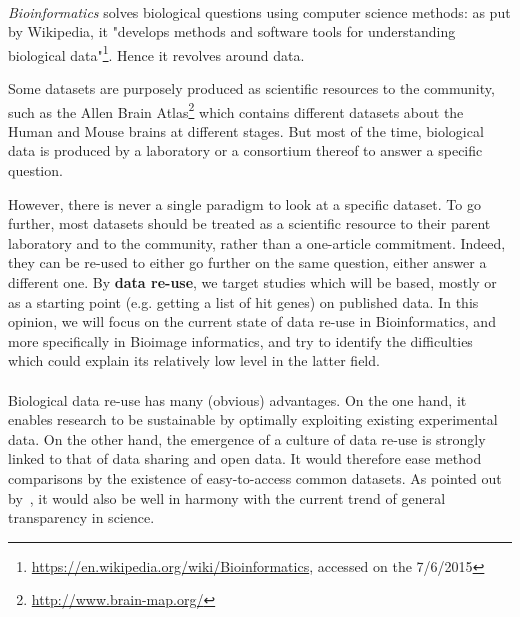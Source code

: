 \documentclass[12pt]{article}
\begin{document}
\paragraph*{}
\textit{Bioinformatics} solves biological questions using computer science methods: as put by Wikipedia, it "develops methods and software tools for understanding biological data"\footnote{\href{https://en.wikipedia.org/wiki/Bioinformatics}{https://en.wikipedia.org/wiki/Bioinformatics}, accessed on the 7/6/2015}. Hence it revolves around data.

Some datasets are purposely produced as scientific resources to the community, such as the Allen Brain Atlas\footnote{\href{http://www.brain-map.org/}{http://www.brain-map.org/}} which contains different datasets about the Human and Mouse brains at different stages. But most of the time, biological data is produced by a laboratory or a consortium thereof to answer a specific question. 

However, there is never a single paradigm to look at a specific dataset. To go further, most datasets should be treated as a scientific resource to their parent laboratory and to the community, rather than a one-article commitment. Indeed, they can be re-used to either go further on the same question, either answer a different one. By \textbf{data re-use}, we target studies which will be based, mostly or as a starting point (e.g. getting a list of hit genes) on published data. In this opinion, we will focus on the current state of data re-use in Bioinformatics, and more specifically in Bioimage informatics, and try to identify the difficulties which could explain its relatively low level in the latter field. 

\paragraph*{}
Biological data re-use has many (obvious) advantages. On the one hand, it enables research to be sustainable by optimally exploiting existing experimental data. On the other hand, the emergence of a culture of data re-use is strongly linked to that of data sharing and open data. It would therefore ease method comparisons by the existence of easy-to-access common datasets. As pointed out by~\cite{pmid24904347}, it would also be well in harmony with the current trend of general transparency in science.
\end{document}

